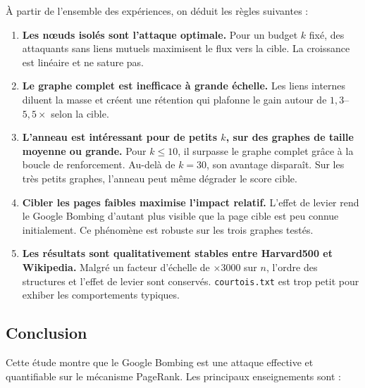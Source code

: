 \documentclass[12pt,a4paper]{article}
\theoremstyle{definition}
\begin{document}
\`{A} partir de l'ensemble des exp\'{e}riences, on d\'{e}duit les r\`{e}gles suivantes :

\begin{enumerate}
  \item \textbf{Les n\oe{}uds isol\'{e}s sont l'attaque optimale.} Pour un budget
    $k$ fix\'{e}, des attaquants sans liens mutuels maximisent le flux vers la
    cible. La croissance est lin\'{e}aire et ne sature pas.

  \item \textbf{Le graphe complet est inefficace \`{a} grande \'{e}chelle.}
    Les liens internes diluent la masse et cr\'{e}ent une r\'{e}tention qui
    plafonne le gain autour de $1{,}3$--$5{,}5\times$ selon la cible.

  \item \textbf{L'anneau est int\'{e}ressant pour de petits $k$, sur des graphes
    de taille moyenne ou grande.} Pour $k \leq 10$,
    il surpasse le graphe complet gr\^{a}ce \`{a} la boucle de renforcement.
    Au-del\`{a} de $k = 30$, son avantage dispara\^{i}t. Sur les tr\`{e}s petits
    graphes, l'anneau peut m\^{e}me d\'{e}grader le score cible.

  \item \textbf{Cibler les pages faibles maximise l'impact relatif.}
    L'effet de levier rend le Google Bombing d'autant plus visible que la
    page cible est peu connue initialement. Ce ph\'{e}nom\`{e}ne est robuste
    sur les trois graphes test\'{e}s.

  \item \textbf{Les r\'{e}sultats sont qualitativement stables entre Harvard500
    et Wikipedia.} Malgr\'{e} un facteur d'\'{e}chelle de $\times 3000$ sur $n$,
    l'ordre des structures et l'effet de levier sont conserv\'{e}s.
    \texttt{courtois.txt} est trop petit pour exhiber les comportements
    typiques.
\end{enumerate}

\subsection{Conclusion}

Cette \'{e}tude montre que le Google Bombing est une attaque effective et
quantifiable sur le m\'{e}canisme PageRank. Les principaux enseignements sont :
\end{document}
